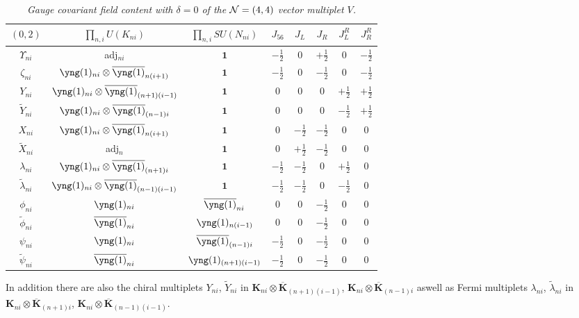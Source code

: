 \documentclass[main.tex]{subfiles}
\begin{document}
\begin{table}
\centering
 \begin{tabular}{|c|c|c|c|c|c|c|c|} 
 \hline
 $(0,2)$ & $\prod_{n,i} U(K_{ni})$ & $\prod_{n,i} SU(N_{ni})$& $J_{56}$&$J_L$&$J_R$&$J_L^R$&$J_R^R$\\\hline\hline
$\Upsilon_{ni}$ &adj$_{ni}$ & $\mathbf{1}$&$-\frac{1}{2}$&$0$&$+\frac{1}{2}$&$0$&$-\frac{1}{2}$\\\hline
$\zeta_{ni}$ &\tiny$\yng(1)_{ni}\otimes\overline{\yng(1)}_{n(i+1)}$ & $\mathbf{1}$&$-\frac{1}{2}$&$0$&$-\frac{1}{2}$&$0$&$-\frac{1}{2}$\\\hline
$Y_{ni}$ &\tiny$\yng(1)_{ni}\otimes\overline{\yng(1)}_{(n+1)(i-1)}$ & $\mathbf{1}$&$0$&$0$&$0$&$+\frac{1}{2}$&$+\frac{1}{2}$\\\hline
$\widetilde{Y}_{ni}$ &\tiny$\yng(1)_{ni}\otimes\overline{\yng(1)}_{(n-1)i}$ & $\mathbf{1}$&$0$&$0$&$0$&$-\frac{1}{2}$&$+\frac{1}{2}$\\\hline
$X_{ni}$ & \tiny$\yng(1)_{ni}\otimes\overline{\yng(1)}_{n(i+1)}$ & $\mathbf{1}$&$0$&$-\frac{1}{2}$&$-\frac{1}{2}$&$0$&$0$\\\hline
$\widetilde{X}_{ni}$ &adj$_n$ & $\mathbf{1}$&$0$&$+\frac{1}{2}$&$-\frac{1}{2}$&$0$&$0$\\\hline
$\lambda_{ni}$ &\tiny$\yng(1)_{ni}\otimes\overline{\yng(1)}_{(n+1)i}$ & $\mathbf{1}$&$-\frac{1}{2}$&$-\frac{1}{2}$&$0$&$+\frac{1}{2}$&$0$\\\hline
$\widetilde{\lambda}_{ni}$ &\tiny$\yng(1)_{ni}\otimes\overline{\yng(1)}_{(n-1)(i-1)}$ & $\mathbf{1}$&$-\frac{1}{2}$&$-\frac{1}{2}$&$0$&$-\frac{1}{2}$&$0$\\\hline
$\phi_{ni}$ &\tiny$\yng(1)_{ni}$& \tiny$\overline{\yng(1)}_{ni}$&$0$&$0$&$-\frac{1}{2}$&$0$&$0$\\\hline
$\widetilde{\phi}_{ni}$ &\tiny$\overline{\yng(1)}_{ni}$& \tiny$\yng(1)_{n(i-1)}$&$0$&$0$&$-\frac{1}{2}$&$0$&$0$\\\hline
$\psi_{ni}$ &\tiny$\yng(1)_{ni}$& \tiny$\overline{\yng(1)}_{(n-1)i}$&$-\frac{1}{2}$&$0$&$-\frac{1}{2}$&$0$&$0$\\\hline
$\widetilde{\psi}_{ni}$ &\tiny$\overline{\yng(1)}_{ni}$& \tiny$\yng(1)_{(n+1)(i-1)}$&$-\frac{1}{2}$&$0$&$-\frac{1}{2}$&$0$&$0$\\\hline
\end{tabular}
\caption{\it Gauge covariant field content with $\delta=0$ of the $\mathcal{N}=(4,4)$ vector multiplet $V$.}
 \label{tab:d1d5ZMZk}
\end{table}
In addition there are also the chiral multiplets $Y_{ni}$, $\widetilde{Y}_{ni}$ in $\mathbf{K}_{ni}\otimes\overline{\mathbf{K}}_{(n+1)(i-1)}$, $\mathbf{K}_{ni}\otimes\overline{\mathbf{K}}_{(n-1)i}$ aswell as Fermi multiplets $\lambda_{ni}$, $\widetilde{\lambda}_{ni}$ in $\mathbf{K}_{ni}\otimes\overline{\mathbf{K}}_{(n+1)i}$, $\mathbf{K}_{ni}\otimes\overline{\mathbf{K}}_{(n-1)(i-1)}$. 
\end{document}
